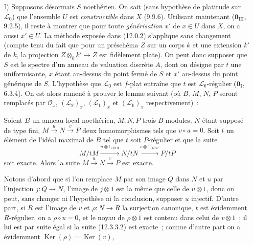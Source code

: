 \medskip
I) Supposons désormais $S$ noethérien. On sait (sans hypothèse de platitude sur
$\mathcal L_0$) que l'ensemble $U$ est \emph{constructible} dans $X$ (9.9.6).
Utilisant maintenant ($\mathbf 0_{\mathrm{III}}$, 9.2.5), il reste à montrer
que pour toute \emph{générisation} $x'$ de $x\in U$ dans $X$, on a aussi
$x'\in U$. La méthode exposée dans (12.0.2) s'applique sans changement (compte
tenu du fait que pour un préschéma $Z$ sur un corps $k$ et une extension $k'$
de $k$, la projection $Z\otimes_k k'\to Z$ est fidèlement plate). On peut donc
supposer que $S$ est le spectre d'un anneau de valuation discrète $A$, dont on
désigne par $t$ une uniformisante, $x$ étant au-dessus du point fermé de $S$ et
$x'$ au-dessus du point générique de $S$. L'hypothèse que $\mathcal L_0$ est
$f$-plat entraîne que $t$ est $\mathcal L_0$-régulier
($\mathbf 0_{\mathrm I}$, 6.3.4). On est alors ramené à prouver le lemme suivant
(où $B$, $M$, $N$, $P$ seront remplacés par $\mathcal O_x$,
$(\mathcal L_2)_x$, $(\mathcal L_1)_x$ et $(\mathcal L_0)_x$ respectivement)~:

\begin{lemma}[12.3.3.1]
\label{IV.12.3.3.1-fr}
Soient $B$ un anneau local noethérien, $M,N,P$ trois $B$-modules, $N$ étant
supposé de type fini, $M\xrightarrow{u}N\xrightarrow{v}P$ deux homomorphismes
tels que $v\circ u=0$. Soit $t$ un élément de l'idéal maximal de $B$ tel que
$t$ soit $P$-régulier et que la suite
\begin{equation}
  \tag{12.3.3.2}
  \label{IV.12.3.3.2-fr}
  M/tM\xrightarrow{u\otimes1_{B/tB}}N/tN
  \xrightarrow{v\otimes1_{B/tB}}P/tP
\end{equation}
soit exacte. Alors la suite $M\xrightarrow{u}N\xrightarrow{v}P$ est exacte.
\end{lemma}

Notons d'abord que si l'on remplace $M$ par son image $Q$ dans $N$ et $u$ par
l'injection $j:Q\to N$, l'image de $j\otimes1$ est la même que celle de
$u\otimes1$, donc on peut, sans changer ni l'hypothèse ni la conclusion,
supposer $u$ injectif. D'autre part, si $R$ est l'image de $v$ et
$\rho:N\to R$ la surjection canonique, $t$ est évidemment $R$-régulier, on a
$\rho\circ u=0$, et le noyau de $\rho\otimes1$ est contenu dans celui de
$v\otimes1$~; il lui est par suite égal si la suite (12.3.3.2) est exacte~;
comme d'autre part on a évidemment $\operatorname{Ker}(\rho)
=\operatorname{Ker}(v)$,

